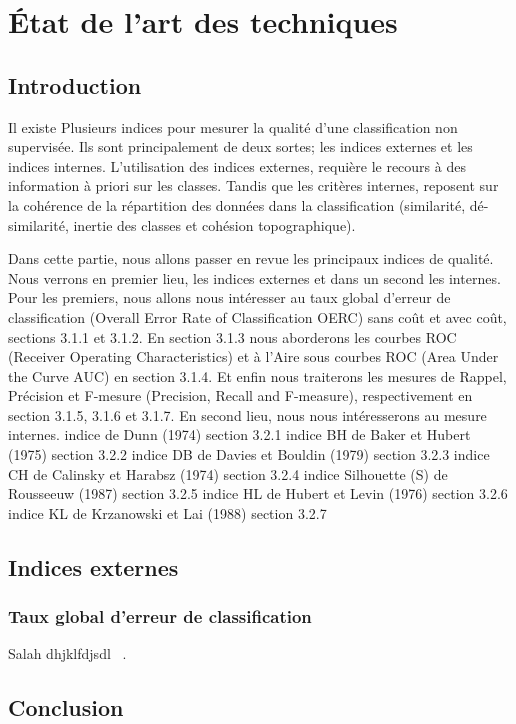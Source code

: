 \chapter{État de l'art des techniques}
\minitoc
\newpage
 
\section{Introduction}

Il existe Plusieurs indices pour mesurer la qualité d'une classification
non supervisée. Ils sont principalement de deux sortes; les indices
externes et les indices internes. L'utilisation des indices externes,
requière le recours à des information à priori sur les classes. Tandis
que les critères internes, reposent sur la cohérence de la répartition
des données dans la classification (similarité, dé-similarité, inertie
des classes et cohésion topographique).

Dans cette partie, nous allons passer en revue les principaux indices de
qualité. Nous verrons en premier lieu, les indices externes et dans un
second les internes. Pour les premiers, nous allons nous intéresser au
taux global d'erreur de classification (Overall Error Rate of
Classification OERC) sans coût et avec coût, sections 3.1.1 et 3.1.2. En
section 3.1.3 nous aborderons les courbes ROC (Receiver Operating
Characteristics) et à l'Aire sous courbes ROC (Area Under the Curve AUC)
en section 3.1.4. Et enfin nous traiterons les mesures de Rappel,
Précision et F-mesure (Precision, Recall and F-measure), respectivement
en section 3.1.5, 3.1.6 et 3.1.7. En second lieu, nous nous
intéresserons au mesure internes. indice de Dunn (1974) section 3.2.1
indice BH de Baker et Hubert (1975) section 3.2.2 indice DB de Davies et
Bouldin (1979) section 3.2.3 indice CH de Calinsky et Harabsz (1974)
section 3.2.4 indice Silhouette (S) de Rousseeuw (1987) section 3.2.5
indice HL de Hubert et Levin (1976) section 3.2.6 indice KL de
Krzanowski et Lai (1988) section 3.2.7

\section{Indices externes}\label{indices-externes}

\subsection{Taux global d'erreur de classification}\label{taux-global-derreur-de-classification}
Salah dhjklfdjsdl ~\cite{hajjar}.

%

\section{Conclusion}
